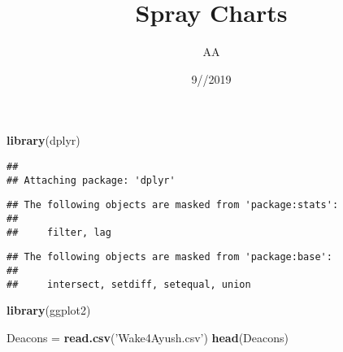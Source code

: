 \documentclass[]{article}
\title{Spray Charts}
\author{AA}
\date{9//2019}
\newenvironment{Shaded}{\begin{snugshade}}{\end{snugshade}}
\newcommand{\KeywordTok}[1]{\textcolor[rgb]{0.13,0.29,0.53}{\textbf{#1}}}
\newcommand{\StringTok}[1]{\textcolor[rgb]{0.31,0.60,0.02}{#1}}
\newcommand{\NormalTok}[1]{#1}
\begin{document}
\maketitle

\begin{Shaded}
\begin{Highlighting}[]
\KeywordTok{library}\NormalTok{(dplyr)}
\end{Highlighting}
\end{Shaded}

\begin{verbatim}
## 
## Attaching package: 'dplyr'
\end{verbatim}

\begin{verbatim}
## The following objects are masked from 'package:stats':
## 
##     filter, lag
\end{verbatim}

\begin{verbatim}
## The following objects are masked from 'package:base':
## 
##     intersect, setdiff, setequal, union
\end{verbatim}

\begin{Shaded}
\begin{Highlighting}[]
\KeywordTok{library}\NormalTok{(ggplot2)}
\end{Highlighting}
\end{Shaded}

\begin{Shaded}
\begin{Highlighting}[]
\NormalTok{Deacons =}\StringTok{ }\KeywordTok{read.csv}\NormalTok{(}\StringTok{'Wake4Ayush.csv'}\NormalTok{)}
\KeywordTok{head}\NormalTok{(Deacons)}
\end{Highlighting}
\end{Shaded}
\end{document}
